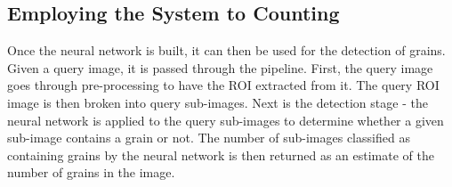 \subsection{Employing the System to Counting}
Once the neural network is built, it can then be used for the detection of grains. Given a query image, it is passed through the pipeline. First, the query image goes through pre-processing to have the ROI extracted from it. The query ROI image is then broken into query sub-images. Next is the detection stage - the neural network is applied to the query sub-images to determine whether a given sub-image contains a grain or not. The number of sub-images classified as containing grains by the neural network is then returned as an estimate of the number of grains in the image.
\bigskip

\goodbreak




\bigskip



